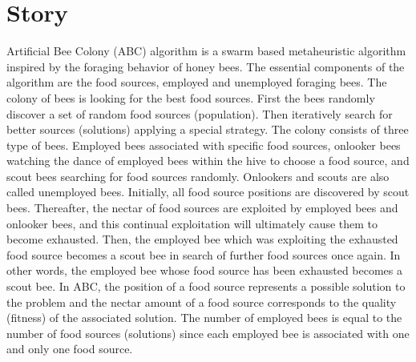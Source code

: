 \documentclass[border=0.2cm]{report}
\begin{document}
\section{Story}
Artificial Bee Colony (ABC) \cite{abc1} algorithm is a swarm based metaheuristic algorithm inspired by the foraging behavior of honey bees. The essential components of the algorithm are the food sources, employed and unemployed foraging bees. The colony of bees is looking for the best food sources. First the bees randomly discover a set of random food sources (population). Then iteratively search for better sources (solutions) applying a special strategy. The colony consists of three type of bees. Employed bees associated with specific food sources, onlooker bees watching the dance of employed bees within the hive to choose a food source, and scout bees searching for food sources randomly. Onlookers and scouts are also called unemployed bees. Initially, all food source positions are discovered by scout bees. Thereafter, the nectar of food sources are exploited by employed bees and onlooker bees, and this continual exploitation will ultimately cause them to become exhausted. Then, the employed bee which was exploiting the exhausted food source becomes a scout bee in search of further food sources once again. In other words, the employed bee whose food source has been exhausted becomes a scout bee. In ABC, the position of a food source represents a possible solution to the problem and the nectar amount of a food source corresponds to the quality (fitness) of the associated solution. The number of employed bees is equal to the number of food sources (solutions) since each employed bee is associated with one and only one food source. \\
\end{document}
